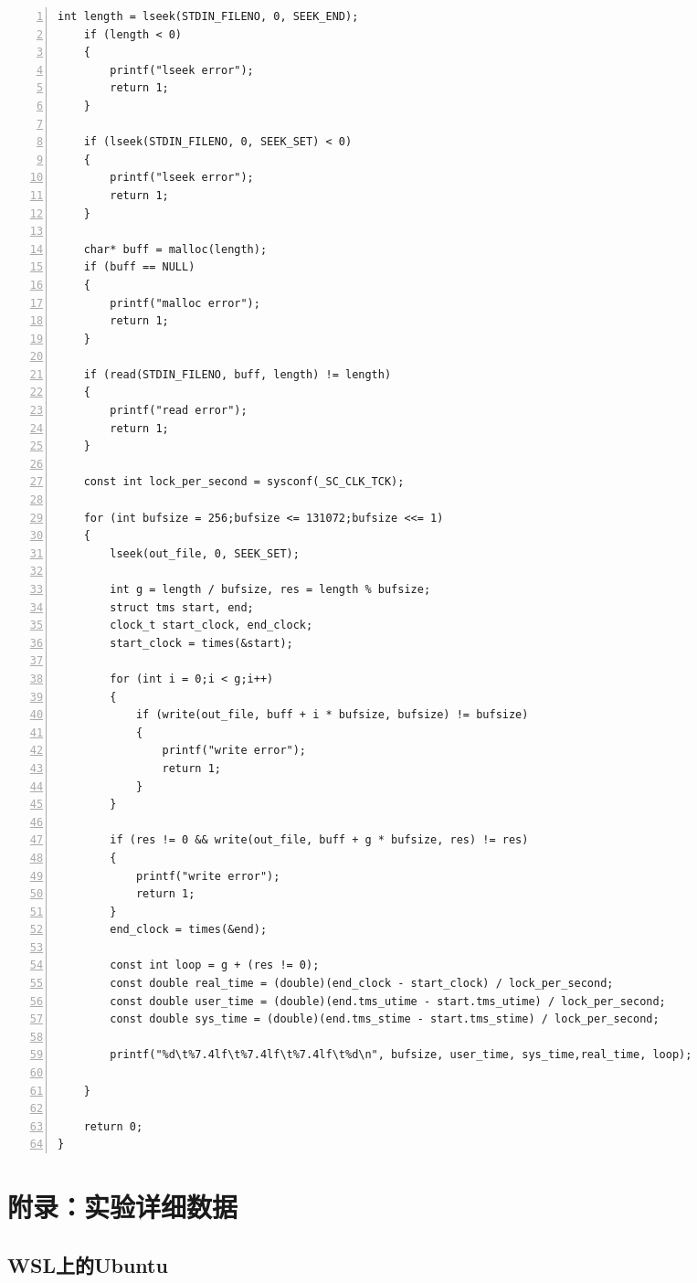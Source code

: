 \documentclass[a4paper,twoside]{article}
\begin{document}
\begin{spacing}{1.2}
\begin{lstlisting}[numbers=left,style=CppStyle,caption=程序实现,label={code:impl}]
    int length = lseek(STDIN_FILENO, 0, SEEK_END);
    if (length < 0)
    {
        printf("lseek error");
        return 1;
    }

    if (lseek(STDIN_FILENO, 0, SEEK_SET) < 0)
    {
        printf("lseek error");
        return 1;
    }

    char* buff = malloc(length);
    if (buff == NULL)
    {
        printf("malloc error");
        return 1;
    }

    if (read(STDIN_FILENO, buff, length) != length)
    {
        printf("read error");
        return 1;
    }

    const int lock_per_second = sysconf(_SC_CLK_TCK);

    for (int bufsize = 256;bufsize <= 131072;bufsize <<= 1)
    {
        lseek(out_file, 0, SEEK_SET);

        int g = length / bufsize, res = length % bufsize;
        struct tms start, end;
        clock_t start_clock, end_clock;
        start_clock = times(&start);
        
        for (int i = 0;i < g;i++)
        {
            if (write(out_file, buff + i * bufsize, bufsize) != bufsize)
            {
                printf("write error");
                return 1;
            }
        }

        if (res != 0 && write(out_file, buff + g * bufsize, res) != res)
        {
            printf("write error");
            return 1;
        }
        end_clock = times(&end);

        const int loop = g + (res != 0);
        const double real_time = (double)(end_clock - start_clock) / lock_per_second;
        const double user_time = (double)(end.tms_utime - start.tms_utime) / lock_per_second;
        const double sys_time = (double)(end.tms_stime - start.tms_stime) / lock_per_second;

        printf("%d\t%7.4lf\t%7.4lf\t%7.4lf\t%d\n", bufsize, user_time, sys_time,real_time, loop);

    }

    return 0;
}
\end{lstlisting}

\clearpage
\section*{附录：实验详细数据}
\label{sec:appendix}

\subsection{WSL上的Ubuntu}


\end{spacing}
\end{document}
